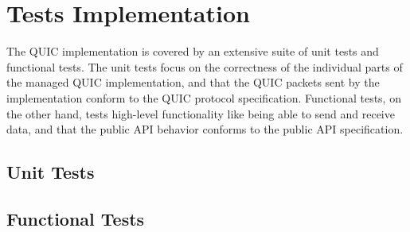 

\section{Tests Implementation}

The QUIC implementation is covered by an extensive suite of unit tests and functional tests. The
unit tests focus on the correctness of the individual parts of the managed QUIC implementation, and
that the QUIC packets sent by the implementation conform to the QUIC protocol specification.
Functional tests, on the other hand, tests high-level functionality like being able to send and
receive data, and that the public API behavior conforms to the public API specification.

\subsection{Unit Tests}

\subsection{Functional Tests}
